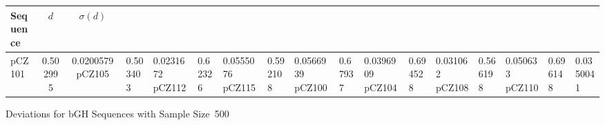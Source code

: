 \begin{cfigure}
\begin{singlespace}
    \begin{tabular}{lcc}
        \toprule
        \textbf{Sequence} & $d$ & $\sigma(d)$\\
        \midrule
        pCZ101 & 0.502995 & 0.0200579
        pCZ105 & 0.503403 & 0.0231672
        pCZ112 & 0.62326 & 0.0555076
        pCZ115 & 0.592108 & 0.0566939
        \midrule
        pCZ100 & 0.67937 & 0.0396909
        pCZ104 & 0.694528 & 0.031062
        pCZ108 & 0.566198 & 0.050633
        pCZ110 & 0.696148 & 0.0350041
        \bottomrule
    \end{tabular}
    \caption{Deviations for bGH Sequences with Sample Size~500}
    \label{bgh:deviation}
\end{singlespace}
\end{cfigure}
